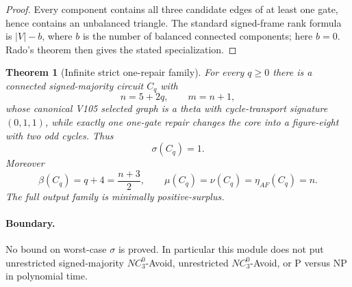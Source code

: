 \documentclass[11pt]{article}
\newtheorem{theorem}{Theorem}
\begin{document}
\begin{proof}
Every component contains all three candidate edges of at least one gate, hence
contains an unbalanced triangle.  The standard signed-frame rank formula is
$|V|-b$, where $b$ is the number of balanced connected components; here $b=0$.
Rado's theorem then gives the stated specialization.
\end{proof}

\begin{theorem}[Infinite strict one-repair family]
For every $q\ge0$ there is a connected signed-majority circuit $C_q$ with
\[
 n=5+2q,\qquad m=n+1,
\]
whose canonical V105 selected graph is a theta with cycle-transport signature
$(0,1,1)$, while exactly one one-gate repair changes the core into a figure-eight
with two odd cycles.  Thus
\[
 \sigma(C_q)=1.
\]
Moreover
\[
 \beta(C_q)=q+4=\frac{n+3}{2},\qquad
 \mu(C_q)=\nu(C_q)=\eta_{AF}(C_q)=n.
\]
The full output family is minimally positive-surplus.
\end{theorem}

\paragraph{Boundary.}
No bound on worst-case $\sigma$ is proved.  In particular this module does not
put unrestricted signed-majority $NC^0_3$-Avoid, unrestricted $NC^0_3$-Avoid,
or P versus NP in polynomial time.
\end{document}
